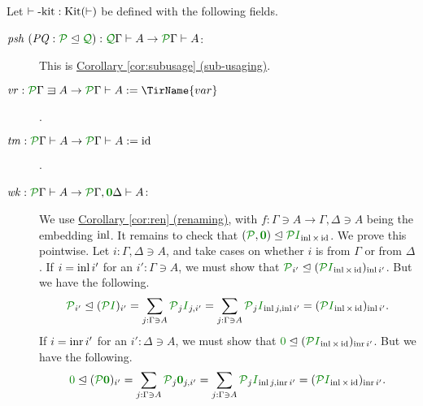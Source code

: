 \documentclass[submission,copyright,creativecommons]{eptcs}
\begin{document}
\begin{definition}\label{tm-kit}
  Let $\vdash\textrm{-kit} : \operatorname{Kit}(\vdash)$ be defined with the following
  fields.
  \begin{description}
    \item[$\mathit{psh}~(\mathit{PQ} : \resctx P \subres \resctx Q)
      : \ctx{\Gamma}{Q} \vdash A \to \ctx{\Gamma}{P} \vdash A$:]
      This is \hyperref[cor:subusage]{Corollary \ref*{cor:subusage} (sub-usaging)}.
      

    \item[$\mathit{vr} : \ctx{\Gamma}{P} \lvar A \to \ctx{\Gamma}{P} \vdash A
      := \TirName{var}$].
    \item[$\mathit{tm} : \ctx{\Gamma}{P} \vdash A \to \ctx{\Gamma}{P} \vdash A
      := \mathrm{id}$].
    \item[$\mathit{wk} : \ctx{\Gamma}{P} \vdash A \to \ctx{\Gamma}{P},
      \ctx{\Delta}{\vct 0} \vdash A$:] We use \hyperref[cor:ren]{Corollary \ref*{cor:ren} (renaming)}, with
      $f : \Gamma \ni A \to \Gamma, \Delta \ni A$ being the embedding
      $\operatorname{inl}$.  It remains to check that
      $(\resctx P, \rescomment{\vct 0}) \subres \resctx P\rescomment
      I_{\inl\times\id}$.  We prove this pointwise.  Let
      $i : \Gamma, \Delta \ni A$, and take cases on whether $i$ is
      from $\Gamma$ or from $\Delta$.  If $i = \operatorname{inl} i'$ for an
      $i' : \Gamma \ni A$, we must show that
      $\resctx P_{i'} \subres (\resctx P\rescomment
      I_{\inl\times\id})_{\inl i'}$.  But we have the following.
      \[
      \resctx P_{i'} \subres (\resctx P\rescomment I)_{i'}
      = \sum_{j : \Gamma \ni A} \resctx P_j\rescomment I_{j,i'}
      = \sum_{j : \Gamma \ni A} \resctx P_j\rescomment I_{\inl j,\inl i'}
      = (\resctx P\rescomment I_{\inl\times\id})_{\inl i'}.
      \]
      If $i = \operatorname{inr} i'$ for an $i' : \Delta \ni A$, we must show that
      $\rescomment 0 \subres
      (\resctx P\rescomment I_{\inl\times\id})_{\inr i'}$.
      But we have the following.
      \[
      \rescomment 0 \subres (\resctx P\rescomment{\vct 0})_{i'}
      = \sum_{j : \Gamma \ni A} \resctx P_j\rescomment{\vct 0}_{j,i'}
      = \sum_{j : \Gamma \ni A} \resctx P_j\rescomment I_{\inl j,\inr i'}
      = (\resctx P\rescomment I_{\inl\times\id})_{\inr i'}.
      \]
  \end{description}
\end{definition}
\end{document}

